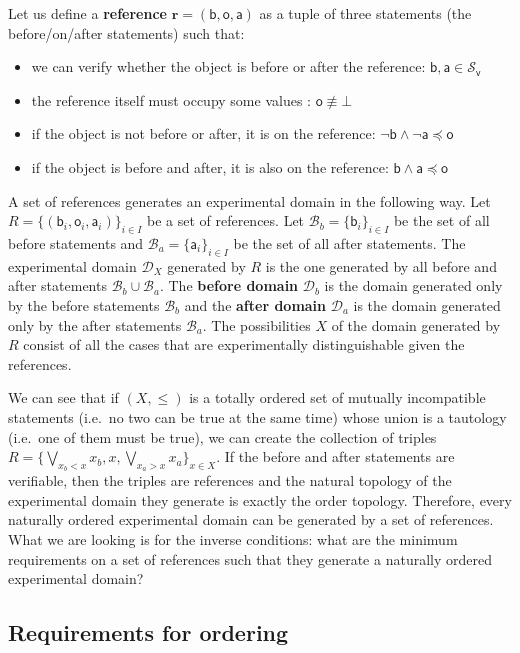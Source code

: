 \documentclass{article}
\def\AND{\wedge}
\def\bigOR{\bigvee}
\def\NOT{\neg}
\def\vstmtSet{\mathcal{S}_\textsf{v}}
\def\contradiction{\bot} %
\newcommand{\stmt}[1][s] {\mathsf{#1}} %
\def\narrower{\preccurlyeq} %
\newcommand{\edomain}[1][D] {\mathcal{#1}} %
\newcommand{\basis}[1][B] {\mathcal{#1}} %
\newcommand{\refStmt}[1][r]{\textbf{#1}}
\begin{document}
Let us define a \textbf{reference} $\refStmt = ( \stmt[b], \stmt[o], \stmt[a] )$ as a tuple of three statements (the before/on/after statements) such that:
\begin{itemize}
	\item we can verify whether the object is before or after the reference: $\stmt[b], \stmt[a] \in \vstmtSet$
	\item the reference itself must occupy some values : $\stmt[o] \nequiv \contradiction$
	\item if the object is not before or after, it is on the reference: $\NOT \stmt[b] \AND \NOT \stmt[a] \narrower \stmt[o]$
	\item if the object is before and after, it is also on the reference: $\stmt[b] \AND \stmt[a] \narrower \stmt[o]$
\end{itemize}
A set of references generates an experimental domain in the following way. Let $R = \{( \stmt[b]_i, \stmt[o]_i, \stmt[a]_i )\}_{i \in I}$ be a set of references. Let $\basis_b = \{\stmt[b]_i\}_{i \in I}$ be the set of all before statements and $\basis_a = \{\stmt[a]_i\}_{i \in I}$ be the set of all after statements. The experimental domain $\edomain_X$ generated by $R$ is the one generated by all before and after statements $\basis_b \cup \basis_a$. The \textbf{before domain} $\edomain_b$ is the domain generated only by the before statements $\basis_b$ and the \textbf{after domain} $\edomain_a$ is the domain generated only by the after statements $\basis_a$. The possibilities $X$ of the domain generated by $R$ consist of all the cases that are experimentally distinguishable given the references.

We can see that if $(X, \leq)$ is a totally ordered set of mutually incompatible statements (i.e.~no two can be true at the same time) whose union is a tautology (i.e.~one of them must be true), we can create the collection of triples $R = \{ \bigOR\limits_{x_b < x} x_b , x , \bigOR\limits_{x_a > x} x_a \}_{x \in X}$. If the before and after statements are verifiable, then the triples are references and the natural topology of the experimental domain they generate is exactly the order topology. Therefore, every naturally ordered experimental domain can be generated by a set of references. What we are looking is for the inverse conditions: what are the minimum requirements on a set of references such that they generate a naturally ordered experimental domain?

\subsection*{Requirements for ordering}
\end{document}
